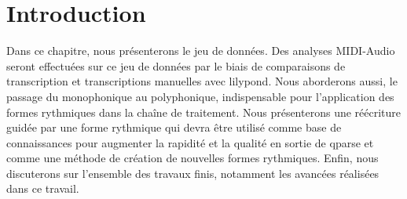 \section*{Introduction}
Dans ce chapitre, nous présenterons le jeu de données. Des analyses MIDI-Audio
seront effectuées sur ce jeu de données par le biais de comparaisons de
transcription et transcriptions manuelles avec lilypond. Nous aborderons aussi,
le passage du monophonique au polyphonique, indispensable pour l’application
des formes rythmiques dans la chaîne de traitement. Nous présenterons une
réécriture guidée par une forme rythmique qui devra être utilisé comme base de
connaissances pour augmenter la rapidité et la qualité en sortie de qparse et
comme une méthode de création de nouvelles formes rythmiques. Enfin, nous
discuterons sur l’ensemble des travaux finis, notamment les avancées réalisées
dans ce travail.

